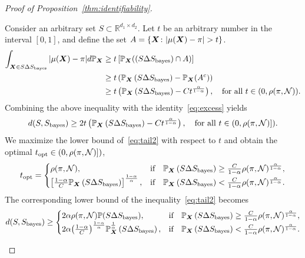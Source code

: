 \documentclass[11pt]{article}
\theoremstyle{plain}
\theoremstyle{definition}
\def\bayesS{S_{\textup{bayes}}}
\begin{document}
\begin{proof}[Proof of Proposition~\ref{thm:identifiability}]
\begin{enumerate}[label={2.\arabic*},wide, labelwidth=!, labelindent=0pt]
Consider an arbitrary set $S\subset\mathbb{R}^{d_1\times d_2}$. Let $t$ be an arbitrary number in the interval $[0,1]$, and define the set $A=\{\mX\colon |\mu(\mX)-\pi|>t\}$. 
\begin{align}
\int_{\bm X\in S\Delta S_{\text{bayes}}}|\mu(\bm X)-\pi|d \mathbb{P}_{\bm X} &\geq t \left[\mathbb{P}_{\bm X}(\left(S\Delta S_{\text{bayes}}) \cap A\right)\right] \\
&\geq t\left( \mathbb{P}_{\bm X}\left(S\Delta S_{\text{bayes}}\right) - \mathbb{P}_{\bm X}(A^c)\right)\\
&\geq t\left( \mathbb{P}_{\bm X}\left(S\Delta S_{\text{bayes}}\right) - Ct^{\alpha\over 1-\alpha}\right),\quad \text{for all }t\in (0,\rho(\pi,\mathcal{N})).
\end{align}
Combining the above inequality with the identity~\eqref{eq:excess} yields
\begin{equation}\label{eq:tail2}
d(S,\bayesS)\geq 2t\left( \mathbb{P}_{\mX}\left(S\Delta S_{\text{bayes}}\right) - Ct^{\alpha\over 1-\alpha}\right),\quad \text{for all }t\in(0,\rho(\pi,\tN)]).
\end{equation}
We maximize the lower bound of~\eqref{eq:tail2} with respect to $t$ and obtain the optimal $t_{\text{opt}}\in(0,\rho(\pi,\mathcal{N})])$,
\[
t_{\text{opt}}=\begin{cases}
\rho(\pi,\mathcal{N}), & \text{if}\quad \mathbb{P}_{\bm X}\left(S\Delta S_{\text{bayes}}\right)\geq {C\over 1-\alpha}\rho(\pi,\mathcal{N})^{{\alpha\over1-\alpha}} ,\\
\left[{1-\alpha \over C}\mathbb{P}_{\bm X}\left(S\Delta S_{\text{bayes}}\right)\right]^{1-\alpha \over \alpha}, & \text{if}\quad \mathbb{P}_{\bm X}\left(S\Delta S_{\text{bayes}}\right)< {C\over 1-\alpha} \rho(\pi,\mathcal{N})^{{\alpha\over1-\alpha}}.
\end{cases}
\]
The corresponding lower bound of the inequality~\eqref{eq:tail2} becomes
\begin{align}
  d(S,\bayesS)\geq\begin{cases}
2\alpha\rho(\pi,\tN)\mathbb{P}(S\Delta \bayesS), & \text{if}\quad \mathbb{P}_{\mX}\left(S\Delta S_{\text{bayes}}\right)\geq {C\over 1-\alpha}\rho(\pi,\tN)^{{\alpha\over1-\alpha}} ,\\
2\alpha{\left(1-\alpha\over C\right)}^{1-\alpha \over \alpha} \mathbb{P}^{1\over \alpha}_{\mX}\left(S\Delta S_{\text{bayes}}\right), & \text{if}\quad \mathbb{P}_{\mX}\left(S\Delta S_{\text{bayes}}\right)< {C\over 1-\alpha} \rho(\pi,\tN)^{{\alpha\over1-\alpha}}.
\end{cases}
\end{align}


\end{enumerate}
\end{proof}
\end{document}
